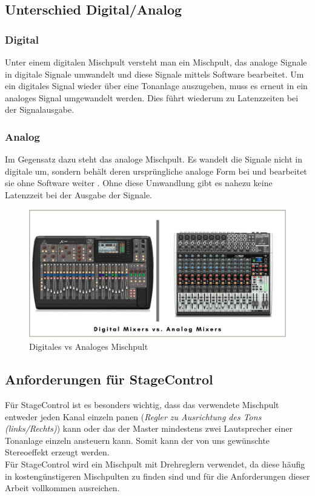 \subsection{Unterschied Digital/Analog}
\subsubsection{Digital}
Unter einem digitalen Mischpult versteht man ein Mischpult, das analoge Signale in digitale Signale umwandelt und diese Signale mittels Software bearbeitet. Um ein digitales Signal wieder über eine Tonanlage auszugeben, muss es erneut in ein analoges Signal umgewandelt werden. Dies führt wiederum zu Latenzzeiten bei der Signalausgabe.
\subsubsection{Analog}
Im Gegensatz dazu steht das analoge Mischpult. Es wandelt die Signale nicht in digitale um, sondern behält deren ursprüngliche analoge Form bei und bearbeitet sie ohne Software weiter \parencite{MischpultAnalogDigital}. Ohne diese Umwandlung gibt es nahezu keine Latenzzeit bei der Ausgabe der Signale. \\


\begin{figure}[H]
	\centering
	\includegraphics[width=0.8\linewidth]{images/DigitalMixerAnalogMixer.png}
	\caption[Digitales vs Analoges Mischpult]{Digitales vs Analoges Mischpult}
	\label{fig:Digitales vs. Analoges Mischpult}
\end{figure}


\subsection{Anforderungen für StageControl}
Für StageControl ist es besonders wichtig, dass das verwendete Mischpult entweder jeden Kanal einzeln panen (\textit{Regler zu Ausrichtung des Tons (links/Rechts)}) kann oder das der Master mindestens zwei Lautsprecher einer Tonanlage einzeln ansteuern kann. Somit kann der von uns gewünschte Stereoeffekt erzeugt werden. \\
Für StageControl wird ein Mischpult mit Drehreglern verwendet, da diese häufig in kostengünstigeren Mischpulten zu finden sind und für die Anforderungen dieser Arbeit vollkommen ausreichen. 




